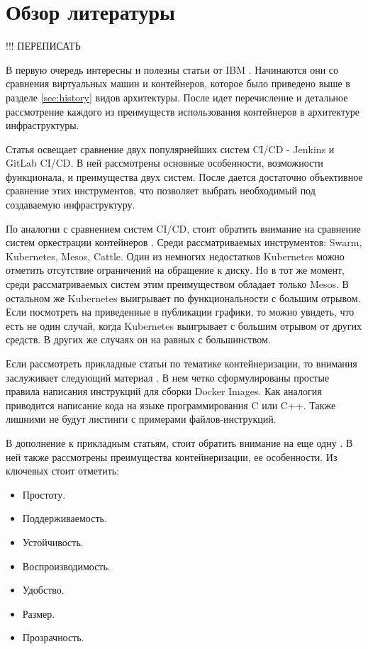 \section{Обзор литературы}
\label{sec:lit-rev}

!!! ПЕРЕПИСАТЬ

В первую очередь интересны и полезны статьи от IBM \cite{ibm:containers1}\cite{ibm:containers2}. Начинаются они со сравнения виртуальных машин и контейнеров, которое было приведено выше в разделе \ref{sec:history} видов архитектуры. После идет перечисление и детальное рассмотрение каждого из преимуществ использования контейнеров в архитектуре инфраструктуры.

Статья \cite{habr:ruvds:jenkins-vs-gitlab} освещает сравнение двух популярнейших систем CI/CD - Jenkins и GitLab CI/CD. В ней рассмотрены основные особенности, возможности функционала, и преимущества двух систем. После дается достаточно объективное сравнение этих инструментов, что позволяет выбрать необходимый под создаваемую инфраструктуру.

По аналогии с сравнением систем CI/CD, стоит обратить внимание на сравнение систем оркестрации контейнеров \cite{al2019container}. Среди рассматриваемых инструментов: Swarm, Kubernetes, Mesos, Cattle. Один из немногих недостатков Kubernetes можно отметить отсутствие ограничений на обращение к диску. Но в тот же момент, среди рассматриваемых систем этим преимуществом обладает только Mesos. В остальном же Kubernetes выигрывает по функциональности с большим отрывом. Если посмотреть на приведенные в публикации графики, то можно увидеть, что есть не один случай, когда Kubernetes выигрывает с большим отрывом от других средств. В других же случаях он на равных с большинством.

Если рассмотреть прикладные статьи по тематике контейнеризации, то внимания заслуживает следующий материал \cite{nust2020ten}. В нем четко сформулированы простые правила написания инструкций для сборки Docker Images. Как аналогия приводится написание кода на языке программирования C или C++. Также лишними не будут листинги с примерами файлов-инструкций.

В дополнение к прикладным статьям, стоит обратить внимание на еще одну \cite{gruening2018recommendations}. В ней также рассмотрены преимущества контейнеризации, ее особенности. Из ключевых стоит отметить:
\begin{itemize}
    \item Простоту.
    \item Поддерживаемость.
    \item Устойчивость.
    \item Воспроизводимость.
    \item Удобство.
    \item Размер.
    \item Прозрачность.
\end{itemize}

